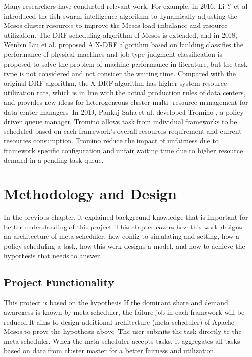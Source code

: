 \documentclass[12pt,oneside,openright,a4paper]{cpe-english-project}
\begin{document}
\hspace{10mm}Many researchers have conducted relevant work. For example, in 2016, Li Y et al \cite{fishSwarm} introduced the fish swarm intelligence algorithm to dynamically adjusting the Mesos cluster resources to improve the Mesos load imbalance and resource utilization. The DRF scheduling algorithm of Mesos is extended, and in 2018, Wenbin Liu et al. proposed A X-DRF algorithm \cite{xdrf} based on building classifies the performance of physical machines and job type judgment classification is proposed to solve the problem of machine performance in literature, but the task type is not considered and not consider the waiting time. Compared with the original DRF algorithm, the X-DRF algorithm has higher system resource utilization rate, which is in line with the actual production rules of data centers, and provides new ideas for heterogeneous cluster multi- resource management for data center managers. In 2019, Pankaj Saha et al. developed Tromino \cite{tromino}, a policy driven queue manager. Tromino allows task from individual frameworks to be scheduled based on each framework’s overall resources requirement and current resources consumption. Tromino reduce the impact of unfairness due to framework specific configuration and unfair waiting time due to higher resource demand in a pending task queue.

\chapter{Methodology and Design}

\hspace{10mm}In the previous chapter, it explained background knowledge that is important for better understanding of this project. This chapter covers how this work designs an architecture of meta-scheduler, how config to simulating and setting, how a policy scheduling a task, how this work designs a model, and how to achieve the hypothesis that needs to answer.

\section{Project Functionality}
\hspace{10mm}This project is based on the hypothesis If the dominant share and demand awareness is known by meta-scheduler, the failure job in each framework will be reduced.It aims to design additional architecture (meta-scheduler) of Apache Mesos to prove the hypothesis above. The user submits the task directly to the meta-scheduler. When the meta-scheduler accepts tasks, it aggregates all tasks based on data from cluster master for a better fairness and utilization.
\end{document}
